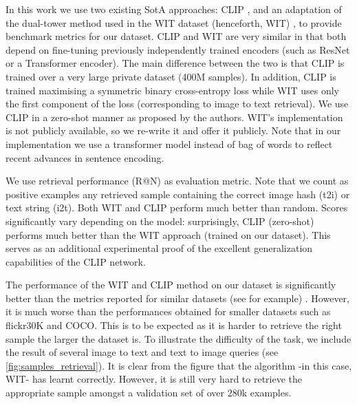 \documentclass[10pt,twocolumn,letterpaper]{article}
\begin{document}
In this work we use two existing SotA approaches: CLIP \cite{radford2021learning}, and an adaptation of the dual-tower method used in the WIT dataset (henceforth, WIT) \cite{srinivasan2021wit}, to provide benchmark metrics for our dataset. CLIP and WIT are very similar in that both depend on fine-tuning previously independently trained encoders (such as ResNet \cite{he2015deep} or a Transformer encoder). The main difference between the two is that CLIP is trained over a very large private dataset (400M samples). In addition, CLIP is trained maximising a symmetric binary cross-entropy loss while WIT uses only the first component of the loss (corresponding to image to text retrieval). We use CLIP in a zero-shot manner as proposed by the authors. WIT's implementation is not publicly available, so we re-write it and offer it publicly. Note that in our implementation we use a transformer model instead of bag of words to reflect recent advances in sentence encoding. 

We use retrieval performance (R@N) as evaluation metric. Note that we count as positive examples any retrieved sample containing the correct image hash (t2i) or text string (i2t). Both WIT and CLIP perform much better than random. Scores significantly vary depending on the model: surprisingly, CLIP (zero-shot) performs much better than the WIT approach (trained on our dataset). This serves as an additional experimental proof of the excellent generalization capabilities of the CLIP network. 

The performance of the WIT and CLIP method on our dataset is significantly better than the metrics reported for similar datasets (see  \cite{srinivasan2021wit} for example) . However, it is much worse than the performances obtained for smaller datasets such as  flickr30K and COCO. This is to be expected as it is harder to retrieve the right sample the larger the dataset is. To illustrate the difficulty of the task, we include the result of several image to text and text to image queries (see \cref{fig:samples_retrieval}). It is clear from the figure that the algorithm -in this case, WIT- has learnt correctly. However, it is still very hard to retrieve the appropriate sample amongst a validation set of over 280k examples.




\begin{table}[ht]
  \centering
    \caption{Performance of the WIT and CLIP methods. ``A" stands for annotation (i2t) and ``Re" for retrieval (t2i) scores.}
  \label{tab:table4}
\end{table}
\end{document}
